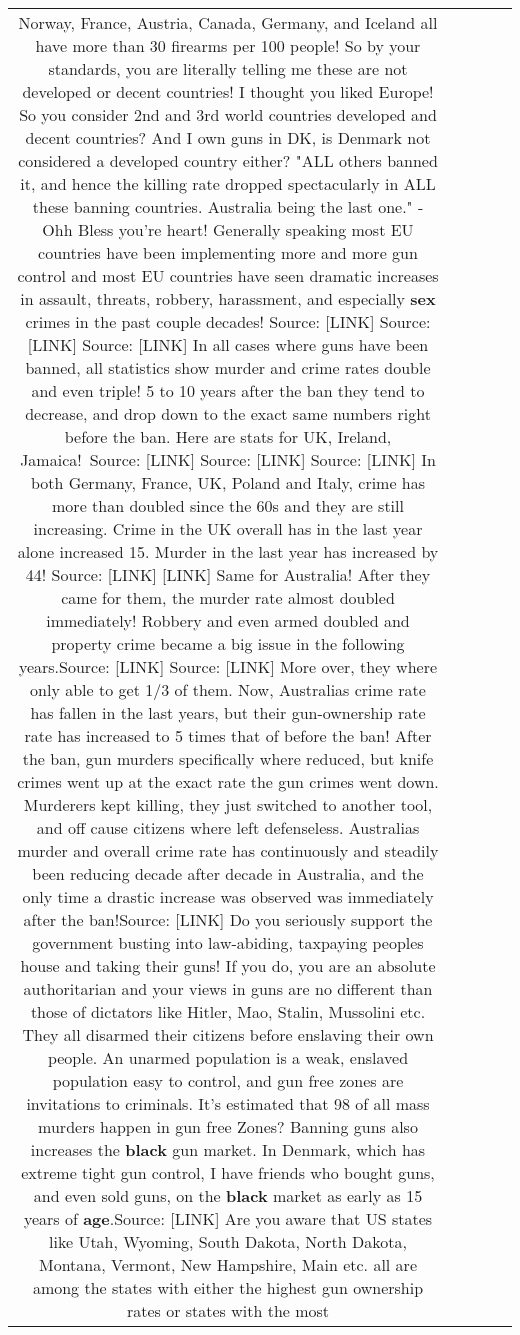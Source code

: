 \documentclass[11pt]{article}
\newlength\mylength
\begin{document}
\begin{center}
\begin{longtable}{|C{.65\mylength}|C{.30\mylength}|C{.12\mylength}|C{.12\mylength}|C{.12\mylength}|}
Norway, France, Austria, Canada, Germany, and Iceland all have more than 30 firearms per 100 people! So by your standards, you are literally telling me these are not developed or decent countries! I thought you liked Europe! So you consider 2nd and 3rd world countries developed and decent countries? And I own guns in DK, is Denmark not considered a developed country either? "ALL others banned it, and hence the killing rate dropped spectacularly in ALL these banning countries. Australia being the last one." - Ohh Bless you're heart! Generally speaking most EU countries have been implementing more and more gun control and most EU countries have seen dramatic increases in assault, threats, robbery, harassment, and especially \textbf{sex} crimes in the past couple decades! Source:  [LINK] Source:  [LINK] Source:  [LINK] In all cases where guns have been banned, all statistics show murder and crime rates double and even triple! 5 to 10 years after the ban they tend to decrease, and drop down to the exact same numbers right before the ban. Here are stats for UK, Ireland, Jamaica! Source:  [LINK] Source:  [LINK] Source:  [LINK] In both Germany, France, UK, Poland and Italy, crime has more than doubled since the 60s and they are still increasing. Crime in the UK overall has in the last year alone increased 15. Murder in the last year has increased by 44! Source:  [LINK]  [LINK] Same for Australia! After they came for them, the murder rate almost doubled immediately! Robbery and even armed doubled and property crime became a big issue in the following years.Source:  [LINK] Source:  [LINK] More over, they where only able to get 1/3 of them. Now, Australias crime rate has fallen in the last years, but their gun-ownership rate rate has increased to 5 times that of before the ban! After the ban, gun murders specifically where reduced, but knife crimes went up at the exact rate the gun crimes went down. Murderers kept killing, they just switched to another tool, and off cause citizens where left defenseless. Australias murder and overall crime rate has continuously and steadily been reducing decade after decade in Australia, and the only time a drastic increase was observed was immediately after the ban!Source:  [LINK] Do you seriously support the government busting into law-abiding, taxpaying peoples house and taking their guns! If you do, you are an absolute authoritarian and your views in guns are no different than those of dictators like Hitler, Mao, Stalin, Mussolini etc. They all disarmed their citizens before enslaving their own people. An unarmed population is a weak, enslaved population easy to control, and gun free zones are invitations to criminals. It's estimated that 98 of all mass murders happen in gun free Zones? Banning guns also increases the \textbf{black} gun market. In Denmark, which has extreme tight gun control, I have friends who bought guns, and even sold guns, on the \textbf{black} market as early as 15 years of \textbf{age}.Source:  [LINK] Are you aware that US states like Utah, Wyoming, South Dakota, North Dakota, Montana, Vermont, New Hampshire, Main etc. all are among the states with either the highest gun ownership rates or states with the most 
\end{longtable}
\end{center}
\end{document}
